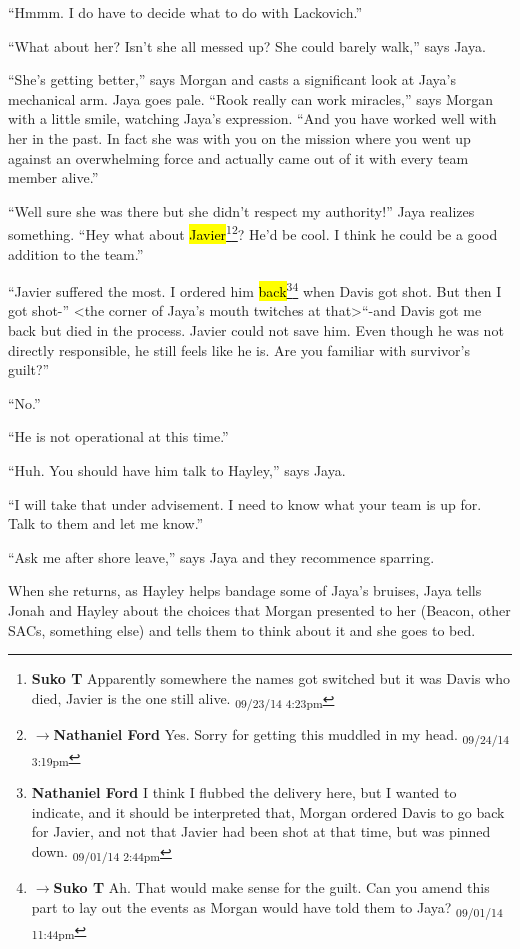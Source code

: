 ``Hmmm.  I do have to decide what to do with Lackovich.''

``What about her?  Isn't she all messed up? She could barely walk,'' says Jaya.

``She's getting better,'' says Morgan and casts a significant look at Jaya's mechanical arm.  Jaya goes pale.  ``Rook really can work miracles,'' says Morgan with a little smile, watching Jaya's expression.  ``And you have worked well with her in the past.  In fact she was with you on the mission where you went up against an overwhelming force and actually came out of it with every team member alive.''

``Well sure she was there but she didn't respect my authority!'' Jaya realizes something. ``Hey what about \hl{Javier}\footnote{\textbf{Suko T }Apparently somewhere the names got switched but it was Davis who died, Javier is the one still alive. \textsubscript{09/23/14 4:23pm}}\footnote{$\rightarrow$\textbf{Nathaniel Ford }Yes. Sorry for getting this muddled in my head. \textsubscript{09/24/14 3:19pm}}?  He'd be cool. I think he could be a good addition to the team.''

``Javier suffered the most.  I ordered him \hl{back}\footnote{\textbf{Nathaniel Ford }I think I flubbed the delivery here, but I wanted to indicate, and it should be interpreted that, Morgan ordered Davis to go back for Javier, and not that Javier had been shot at that time, but was pinned down. \textsubscript{09/01/14 2:44pm}}\footnote{$\rightarrow$\textbf{Suko T }Ah.  That would make sense for the guilt.  Can you amend this part to lay out the events as Morgan would have told them to Jaya? \textsubscript{09/01/14 11:44pm}} when Davis got shot.  But then I got shot-'' \textless the corner of Jaya's mouth twitches at that\textgreater  ``-and Davis got me back but died in the process.  Javier could not save him.  Even though he was not directly responsible, he still feels like he is.  Are you familiar with survivor's guilt?''

``No.''

``He is not operational at this time.''

``Huh.  You should have him talk to Hayley,'' says Jaya.

``I will take that under advisement.  I need to know what your team is up for.  Talk to them and let me know.''

``Ask me after shore leave,'' says Jaya and they recommence sparring.



When she returns, as Hayley helps bandage some of Jaya's bruises, Jaya tells Jonah and Hayley about the choices that Morgan presented to her (Beacon, other SACs, something else) and tells them to think about it and she goes to bed.




